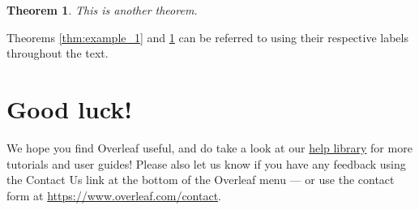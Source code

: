 \documentclass{article}
\newtheorem{theorem}{Theorem}
\begin{document}
\begin{theorem} \label{thm:example_2} This is another theorem.
\end{theorem}

Theorems \ref{thm:example_1} and \ref{thm:example_2} can be referred to using
their respective labels throughout the text.



\section{Good luck!}

We hope you find Overleaf useful, and do take a look at our
\href{https://www.overleaf.com/learn}{help library} for more tutorials and user
guides! Please also let us know if you have any feedback using the Contact Us
link at the bottom of the Overleaf menu --- or use the contact form at
\url{https://www.overleaf.com/contact}.




\end{document}
